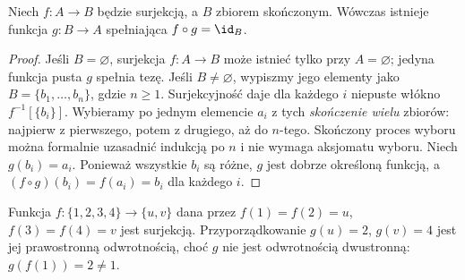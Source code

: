\begin{twierdzenie}
\label{thm:finite-section-xliv}
Niech $f:A\to B$ będzie surjekcją, a $B$ zbiorem skończonym.
Wówczas istnieje funkcja $g:B\to A$ spełniająca
$f\circ g=\id_B$.
\end{twierdzenie}
\begin{proof}
Jeśli $B=\varnothing$, surjekcja $f:A\to B$ może istnieć
tylko przy $A=\varnothing$; jedyna funkcja pusta $g$
spełnia tezę.
Jeśli $B\ne\varnothing$, wypiszmy jego elementy jako
$B=\{b_1,\dots,b_n\}$, gdzie $n\ge1$.
Surjekcyjność daje dla każdego $i$ niepuste włókno
$f^{-1}[\{b_i\}]$. Wybieramy po jednym elemencie $a_i$
z tych \emph{skończenie wielu} zbiorów: najpierw z pierwszego,
potem z drugiego, aż do $n$-tego. Skończony proces wyboru
można formalnie uzasadnić indukcją po $n$ i nie wymaga aksjomatu
wyboru. Niech $g(b_i)=a_i$. Ponieważ wszystkie $b_i$ są różne,
 $g$ jest dobrze określoną funkcją, a
$(f\circ g)(b_i)=f(a_i)=b_i$ dla każdego $i$.
\end{proof}
\begin{przyklad}
Funkcja $f:\{1,2,3,4\}\to\{u,v\}$ dana przez
$f(1)=f(2)=u$, $f(3)=f(4)=v$ jest surjekcją.
Przyporządkowanie $g(u)=2$, $g(v)=4$ jest jej prawostronną
odwrotnością, choć $g$ nie jest odwrotnością dwustronną:
$g(f(1))=2\ne1$.
\end{przyklad}


